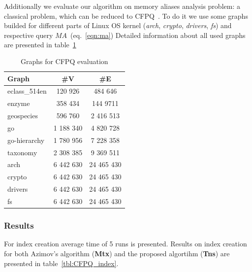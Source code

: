 Additionally we evaluate our algorithm on memory aliases analysis problem: a classical problem, which can be reduced to CFPQ~\cite{!!!}.
To do it we use some graphs builded for different parts of Linux OS kernel (\textit{arch}, \textit{crypto}, \textit{drivers}, \textit{fs}) and respective query $MA$~(eq.~\ref{eqn:ma})
Detailed information about all used graphs are presented in table~\ref{tbl:graphs_for_cfpq}
\begin{table}
{
\begin{tabular}{|l|c|c|}
\hline
Graph & \#V & \#E \\
\hline
\hline 
eclass\_514en  & 120 926 & 484 646 \\
enzyme  & 358 434 & 144 9711 \\
geospecies  & 596 760 & 2 416 513 \\
go   & 1 188 340 & 4 820 728 \\
go-hierarchy & 1 780 956 & 7 228 358 \\
taxonomy & 2 308 385 & 9 369 511 \\
\hline
arch & 6 442 630 & 24 465 430 \\
crypto & 6 442 630 & 24 465 430 \\
drivers & 6 442 630 & 24 465 430 \\
fs & 6 442 630 & 24 465 430 \\
\hline
\end{tabular}
}
\caption{Graphs for CFPQ evaluation}
\label{tbl:graphs_for_cfpq}
\end{table}

\subsubsection{Results}

For index creation average time of 5 runs is presented.
Results on index creation for both Azimov's algorithm (\textbf{Mtx}) and the proposed algortihm (\textbf{Tns}) are presented in table~\ref{tbl:CFPQ_index}.

